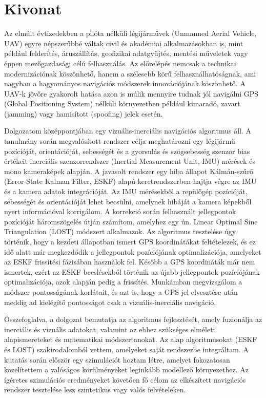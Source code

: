 \selecthungarian%
\chapter*{Kivonat}

Az elmúlt évtizedekben a pilóta nélküli légijárművek (Unmanned Aerial Vehicle, UAV) egyre népszerűbbé váltak civil és akadémiai alkalmazásokban is, mint például felderítés, áruszállítás, geofizikai adatgyűjtés, mentési műveletek vagy éppen mezőgazdasági célú felhasználás. Az előrelépés nemcsak a technikai modernizációnak köszönhető, hanem a szélesebb körű felhasználhatóságnak, ami nagyban a hagyományos navigációs módszerek innovációjának köszönhető. A UAV-k jövőre gyakorolt hatása azon is múlik mennyire tudnak jól navigálni GPS (Global Positioning System) nélküli környezetben például kimaradó, zavart (jamming) vagy hamisított (spoofing) jelek esetén.

Dolgozatom középpontjában egy vizuális-inerciális navigációs algoritmus áll. A tanulmány során megvalósított rendszer célja meghatározni egy légijármű pozícióját, orientációját, sebességét és a gyorsulás és szögsebesség szenzor bias értékeit inerciális szenzorrendszer (Inertial Measurement Unit, IMU) mérések és mono kameraképek alapján. A javasolt rendszer egy hiba állapot Kálmán-szűrő (Error-State Kalman Filter, ESKF) alapú keretrendszerben hajtja végre az IMU és a kamera adatok integrációját. Az IMU mérésekből a repülőgép pozícióját, sebességét és orientációját lehet becsülni, amelynek hibáját a kamera képekből nyert információval korrigálom. A korrekció során felhasznált jellegpontok pozícióját háromszögelés útján számítom, amelyhez egy ún. Linear Optimal Sine Triangulation (LOST) módszert alkalmazok. Az algoritmus tesztelése úgy történik, hogy a kezdeti állapotban ismert GPS koordinátákat feltételezek, és ez idő alatt már megkezdődik a jellegpontok pozíciójának optimalizációja, amelyeket az ESKF frissítési fázisában használok fel. Később a GPS koordináták már nem ismertek, ezért az ESKF becslésekből történik az újabb jellegpontok pozíciójának optimalizációja, azok alapján pedig a frissítés. Munkámban megvizsgálom a módszer pontosságának korlátait, és azt is, hogy a GPS jel elvesztése után meddig ad kielégítő pontosságot csak a vizuális-inerciális navigáció.

Összefoglalva, a dolgozat bemutatja az algoritmus fejlesztését, amely fuzionálja az inerciális és vizuális adatokat, valamint az ehhez szükséges elméleti alapismereteket és matematikai módszertanokat. Az alap algoritmusokat (ESKF és LOST) szakirodalomból vettem, amelyeket saját rendszerbe integráltam. A kutatás során először egy szimulációt hoztam létre, amelyet fokozatosan közelítettem a valóságos körülményeket leginkább modellező környezethez. Az ígéretes szimulációs eredményeket követően fő célom az elkészített navigációs rendszer tesztelése lesz szintetikus vagy valós felvételeken.


